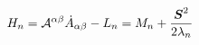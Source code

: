 \begin{equation}
H_n= {\cal{A}}^{\alpha\beta} {\dot{A}}_{\alpha\beta} -L_n= M_n + \frac{{\mbox{\boldmath$S$}}^2}{2 \lambda_n}
\end{equation}

